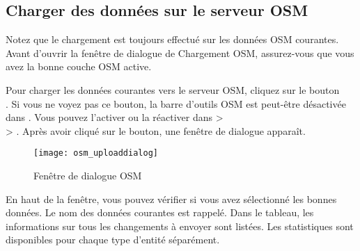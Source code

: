 \subsection{Charger des données sur le serveur OSM}  

Notez que le chargement est toujours effectué sur les données OSM courantes. Avant d'ouvrir la fenêtre de dialogue de Chargement OSM, assurez-vous que vous avez la bonne couche OSM active.

Pour charger les données courantes vers le serveur OSM, cliquez sur le bouton\\ . Si vous ne voyez pas ce bouton, la barre d'outils OSM est peut-être désactivée dans \qg. Vous pouvez l'activer ou la réactiver dans  >\\  > . Après avoir cliqué sur le bouton, une fenêtre de dialogue apparaît.

\begin{figure}[ht]
\centering
   \texttt{[image: osm\_uploaddialog]}
   \caption{Fenêtre de dialogue OSM \nixcaption}\label{fig:osmupload}
\end{figure}

En haut de la fenêtre, vous pouvez vérifier si vous avez sélectionné les bonnes données. Le nom des données courantes est rappelé. Dans le tableau, les informations sur tous les changements à envoyer sont listées. Les statistiques sont disponibles pour chaque type d'entité séparément.

